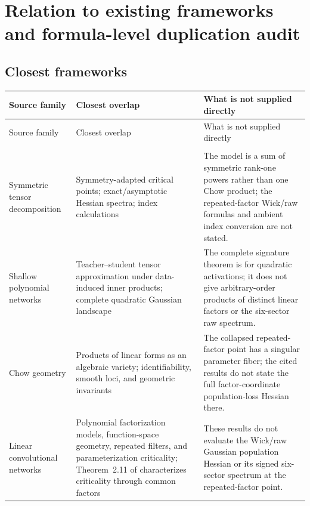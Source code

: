 \documentclass[11pt]{article}
\begin{document}
\clearpage
\section{Relation to existing frameworks and formula-level duplication audit}
\label{sec:novelty-audit}

\subsection{Closest frameworks}

\begingroup
\small
\setlength{\LTleft}{0pt}
\setlength{\LTright}{0pt}
\begin{longtable}{@{}>{\raggedright\arraybackslash}p{}>{\raggedright\arraybackslash}p{}>{\raggedright\arraybackslash}p{}@{}}
\toprule
Source family & Closest overlap & What is not supplied directly \\
\midrule
\endfirsthead
\toprule
Source family & Closest overlap & What is not supplied directly \\
\midrule
\endhead
\midrule
\multicolumn{3}{r}{\footnotesize Continued on next page}\\
\endfoot
\bottomrule
\endlastfoot
Symmetric tensor decomposition \cite{arjevani_vinograd} & Symmetry-adapted critical points; exact/asymptotic Hessian spectra; index calculations & The model is a sum of symmetric rank-one powers rather than one Chow product; the repeated-factor Wick/raw formulas and ambient index conversion are not stated. \\
Shallow polynomial networks \cite{arjevani_polynomial} & Teacher--student tensor approximation under data-induced inner products; complete quadratic Gaussian landscape & The complete signature theorem is for quadratic activations; it does not give arbitrary-order products of distinct linear factors or the six-sector raw spectrum. \\
Chow geometry \cite{torrance_vannieuwenhoven,kubjas_geometry} & Products of linear forms as an algebraic variety; identifiability, smooth loci, and geometric invariants & The collapsed repeated-factor point has a singular parameter fiber; the cited results do not state the full factor-coordinate population-loss Hessian there. \\
Linear convolutional networks \cite{kohn_geometry_lcn,kohn_function_space_lcn} & Polynomial factorization models, function-space geometry, repeated filters, and parameterization criticality; Theorem~2.11 of \cite{kohn_function_space_lcn} characterizes criticality through common factors & These results do not evaluate the Wick/raw Gaussian population Hessian or its signed six-sector spectrum at the repeated-factor point. \\

\end{longtable}
\end{document}

